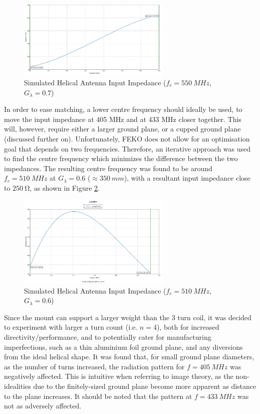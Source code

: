 \begin{figure}[!htb]
  \centering
  \includegraphics[width=0.65\textwidth]{helix3_impedance}
  \caption{Simulated Helical Antenna Input Impedance ($f_c = \SI{550}{MHz}$, $G_\lambda = 0.7$)}
  \label{fig:helix3_impedance}
\end{figure}

In order to ease matching, a lower centre frequency should ideally be used, to move the input impedance at 405 MHz and at 433 MHz closer together. This will, however, require either a larger ground plane, or a cupped ground plane (discussed further on). Unfortunately, FEKO does not allow for an optimisation goal that depends on two frequencies. Therefore, an iterative approach was used to find the centre frequency which minimizes the difference between the two impedances. The resulting centre frequency was found to be around $f_c = \SI{510}{MHz}$ at $G_\lambda = 0.6$ ($\approx \SI{350}{mm}$), with a resultant input impedance close to $\SI{250}{\ohm}$, as shown in Figure \ref{fig:helix4_impedance}.

\begin{figure}[!htb]
  \centering
  \includegraphics[width=0.65\textwidth]{helix4_impedance}
  \caption{Simulated Helical Antenna Input Impedance ($f_c = \SI{510}{MHz}$, $G_\lambda = 0.6$)}
  \label{fig:helix4_impedance}
\end{figure}

Since the mount can support a larger weight than the 3 turn coil, it was decided to experiment with larger a turn count (i.e. $n=4$), both for increased directivity/performance, and to potentially cater for manufacturing imperfections, such as a thin aluminium foil ground plane, and any diversions from the ideal helical shape. It was found that, for small ground plane diameters, as the number of turns increased, the radiation pattern for $f = \SI{405}{MHz}$ was negatively affected. This is intuitive when referring to image theory, as the non-idealities due to the finitely-sized ground plane become more apparent as distance to the plane increases. It should be noted that the pattern at $f = \SI{433}{MHz}$ was not as adversely affected.

